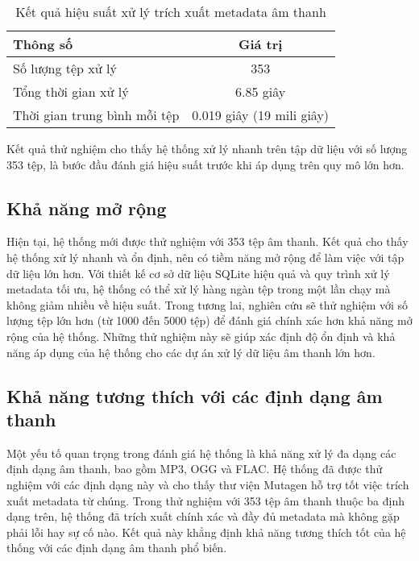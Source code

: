 \documentclass[conference]{IEEEtran}
\begin{document}
\begin{table}[H]
    \centering
    \caption{Kết quả hiệu suất xử lý trích xuất metadata âm thanh}
    \begin{tabular}{|l|c|}
    \hline
    \textbf{Thông số} & \textbf{Giá trị} \\
    \hline
    Số lượng tệp xử lý & 353 \\
    Tổng thời gian xử lý & 6.85 giây \\
    Thời gian trung bình mỗi tệp & 0.019 giây (19 mili giây) \\
    \hline
    \end{tabular}
    \label{tab:performance}
\end{table}

Kết quả thử nghiệm cho thấy hệ thống xử lý nhanh trên tập dữ liệu với số lượng 353 tệp, là bước đầu đánh giá hiệu suất trước khi áp dụng trên quy mô lớn hơn.

\subsection{Khả năng mở rộng}

Hiện tại, hệ thống mới được thử nghiệm với 353 tệp âm thanh. Kết quả cho thấy hệ thống xử lý nhanh và ổn định, nên có tiềm năng mở rộng để làm việc với tập dữ liệu lớn hơn.
Với thiết kế cơ sở dữ liệu SQLite hiệu quả và quy trình xử lý metadata tối ưu, hệ thống có thể xử lý hàng ngàn tệp trong một lần chạy mà không giảm nhiều về hiệu suất.
Trong tương lai, nghiên cứu sẽ thử nghiệm với số lượng tệp lớn hơn (từ 1000 đến 5000 tệp) để đánh giá chính xác hơn khả năng mở rộng của hệ thống.
Những thử nghiệm này sẽ giúp xác định độ ổn định và khả năng áp dụng của hệ thống cho các dự án xử lý dữ liệu âm thanh lớn hơn.

\subsection{Khả năng tương thích với các định dạng âm thanh}

Một yếu tố quan trọng trong đánh giá hệ thống là khả năng xử lý đa dạng các định dạng âm thanh, bao gồm MP3, OGG và FLAC. Hệ thống đã được thử nghiệm với các định dạng này và cho thấy thư viện Mutagen hỗ trợ tốt việc trích xuất metadata từ chúng.
Trong thử nghiệm với 353 tệp âm thanh thuộc ba định dạng trên, hệ thống đã trích xuất chính xác và đầy đủ metadata mà không gặp phải lỗi hay sự cố nào. Kết quả này khẳng định khả năng tương thích tốt của hệ thống với các định dạng âm thanh phổ biến.
\end{document}
